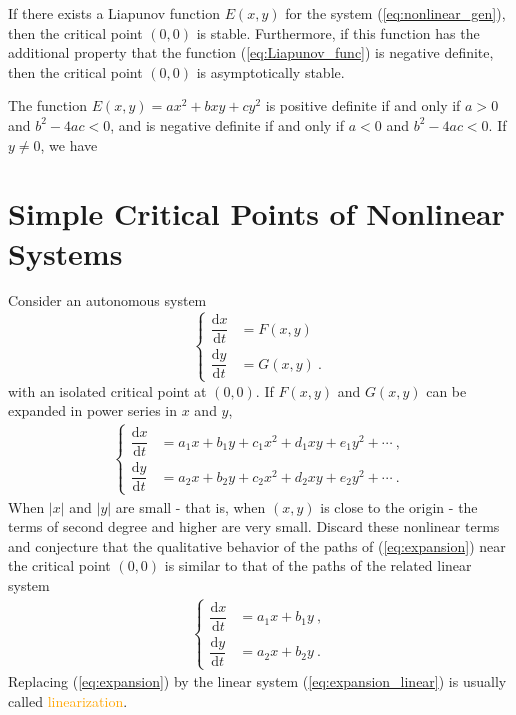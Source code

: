 \documentclass[12pt,a4paper]{article}
\newcommand{\dif}{\mathrm{d}}
\begin{document}
\begin{tcolorbox}[colback=green!5,colframe=green!40!black,title= Theorem A]
If there exists a Liapunov function $E(x,y)$ for the system (\ref{eq:nonlinear_gen}), then the critical point $(0,0)$ is stable. Furthermore, if this function has the additional property that the function (\ref{eq:Liapunov_func}) is negative definite, then the critical point $(0,0)$ is asymptotically stable.
\end{tcolorbox}





\begin{tcolorbox}[colback=green!5,colframe=green!40!black,title= Theorem B]
The function $E(x,y) = ax^2+bxy+cy^2$ is positive definite if and only if $a > 0$ and $b^2 - 4ac < 0$, and is negative definite if and only if $a < 0$ and $b^2 - 4ac < 0$.
If $y \neq 0$, we have
\end{tcolorbox}


\section{Simple Critical Points of Nonlinear Systems}
\cite{george1991differential, simmons2016differential} Consider an autonomous system
\begin{equation*}
\left\{
\begin{aligned}
\dfrac{\dif x}{\dif t} & =  F(x,y) \\
\dfrac{\dif y}{\dif t} & =  G(x, y) ~.
\end{aligned}
\right.
\label{eq:nonlinear_gen}
\end{equation*}
with an isolated critical point at $(0,0)$. If $F(x,y)$ and $G(x,y)$ can be expanded in power series in $x$ and $y$,
\begin{align}
\left\{
\begin{aligned}
\dfrac{\dif x}{\dif t} &= a_1 x + b_1 y +c_1 x^2 + d_1 xy + e_1 y^2 + \cdots ~, \\
\dfrac{\dif y}{\dif t} &= a_2 x + b_2 y +c_2 x^2 + d_2 xy + e_2 y^2 + \cdots ~.
\end{aligned}
\right.
\label{eq:expansion}
\end{align}
When $|x|$ and $|y|$ are small - that is, when $(x,y)$ is close to the origin - the terms of second degree and higher are very small. Discard these nonlinear terms and conjecture that the qualitative behavior of the paths of (\ref{eq:expansion}) near the critical point $(0,0)$ is similar to that of the paths of the related linear system
\begin{align}
\left\{
\begin{aligned}
\dfrac{\dif x}{\dif t} &= a_1 x + b_1 y  ~, \\
\dfrac{\dif y}{\dif t} &= a_2 x + b_2 y ~.
\end{aligned}
\right.
\label{eq:expansion_linear}
\end{align}
Replacing (\ref{eq:expansion}) by the linear system (\ref{eq:expansion_linear}) is usually called \textcolor{orange}{linearization}.
\end{document}
